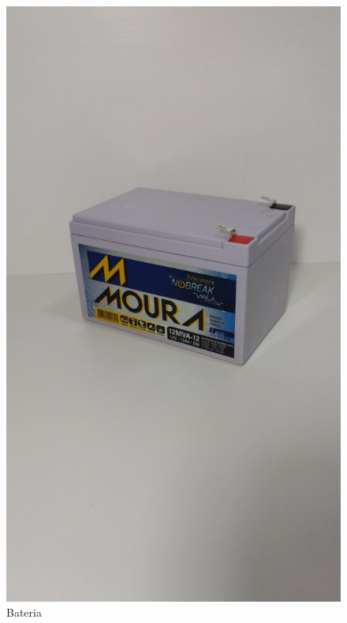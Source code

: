 \begin{figure}[h]
\centering
\includegraphics[keepaspectratio=true,scale=0.15]{figuras/bateria1}
\caption{Bateria}
\label{Figura3}
\end{figure}

